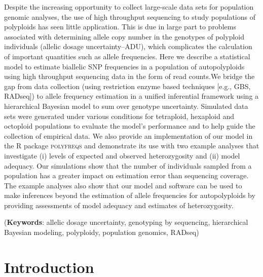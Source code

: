 \documentclass[11pt,english,letterpaper,oneside]{article}
\begin{document}
Despite the increasing opportunity to collect large-scale data sets for population genomic analyses, the use of high throughput sequencing to study populations of polyploids has seen little application. This is due in large part to problems associated with determining allele copy number in the genotypes of polyploid individuals (allelic dosage uncertainty--ADU), which complicates the calculation of important quantities such as allele frequencies. Here we describe a statistical model to estimate biallelic SNP frequencies in a population of autopolyploids using high throughput sequencing data in the form of read counts.We bridge the gap from data collection (using restriction enzyme based techniques [e.g., GBS, RADseq]) to allele frequency estimation in a unified inferential framework using a hierarchical Bayesian model to sum over genotype uncertainty. Simulated data sets were generated under various conditions for tetraploid, hexaploid and octoploid populations to evaluate the model's performance and to help guide the collection of empirical data. We also provide an implementation of our model in the R package \textsc{polyfreqs} and demonstrate its use with two example analyses that investigate (i) levels of expected and observed heterozygosity and (ii) model adequacy. Our simulations show that the number of individuals sampled from a population has a greater impact on estimation error than sequencing coverage. The example analyses also show that our model and software can be used to make inferences beyond the estimation of allele frequencies for autopolyploids by providing assessments of model adequacy and estimates of heterozygosity.
\vspace{0.25in}

\noindent (\textbf{Keywords}: allelic dosage uncertainty, genotyping by sequencing, hierarchical Bayesian modeling, polyploidy, population genomics, RADseq)
\vspace{0.25in}

\section{Introduction}            %
\end{document}
